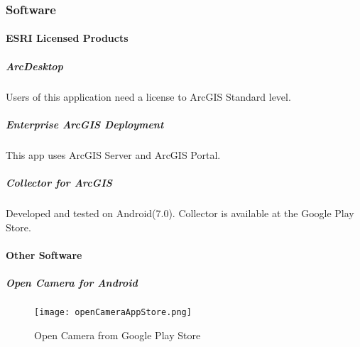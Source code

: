 \subsubsection{Software}
\paragraph{ESRI Licensed Products}
\subparagraph{ArcDesktop}Users of this application need a license to ArcGIS Standard level.
\subparagraph{Enterprise ArcGIS Deployment}This app uses ArcGIS Server and ArcGIS Portal.
\subparagraph{Collector for ArcGIS}Developed and tested on Android(7.0).  Collector is available at the Google Play Store.
\paragraph{Other Software}
\subparagraph{Open Camera for Android}
\begin{figure}[h!]
\centering
    \texttt{[image: openCameraAppStore.png]}
\caption{Open Camera from Google Play Store}
\end{figure}

